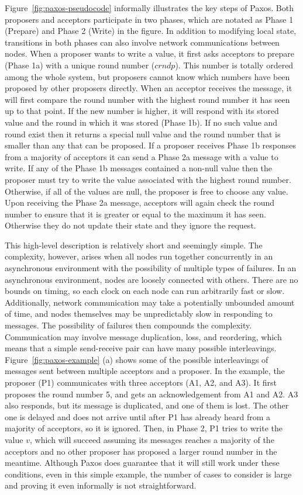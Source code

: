 Figure~\ref{fig:paxos-pseudocode} informally illustrates the key steps of Paxos.
Both proposers and acceptors participate in two phases, which are notated as Phase 1 (Prepare) and Phase 2 (Write) in the figure.
In addition to modifying local state, transitions in both phases can also involve network communications between nodes.
When a proposer wants to write a value, it first asks acceptors to prepare (Phase 1a) with a unique round number ($crndp$).
This number is totally ordered among the whole system, but proposers cannot know which numbers have been proposed by other proposers directly.
When an acceptor receives the message, it will first compare the round number with the highest round number it has seen up to that point.
If the new number is higher, it will respond with its stored value and the round in which it was stored (Phase 1b).
If no such value and round exist then it returns a special null value and the round number that is smaller than any that can be proposed.
If a proposer receives Phase 1b responses from a majority of acceptors it can send a Phase 2a message with a value to write.
If any of the Phase 1b messages contained a non-null value then the proposer must try to write the value associated with the highest round number.
Otherwise, if all of the values are null, the proposer is free to choose any value.
Upon receiving the Phase 2a message, acceptors will again check the round number to ensure that it is greater or equal to the maximum it has seen.
Otherwise they do not update their state and they ignore the request.


This high-level description is relatively short and seemingly simple.
The complexity, however, arises when all nodes run together concurrently in an asynchronous environment with the possibility of multiple types of failures.
In an asynchronous environment, nodes are loosely connected with others.
There are no bounds on timing, so each clock on each node can run arbitrarily fast or slow.
Additionally, network communication may take a potentially unbounded amount of time,
and nodes themselves may be unpredictably slow in responding to messages.
The possibility of failures then compounds the complexity.
Communication may involve message duplication, loss, and reordering, which means that a simple send-receive pair can have many possible interleavings.
Figure~\ref{fig:paxos-example} (a) shows some of the possible interleavings of messages sent between multiple acceptors and a proposer.
In the example, the proposer (P1) communicates with three acceptors (A1, A2, and A3).
It first proposes the round number 5, and gets an acknowledgement from A1 and A2.
A3 also responds, but its message is duplicated, and one of them is lost.
The other one is delayed and does not arrive until after P1 has already heard from a majority of acceptors, so it is ignored.
Then, in Phase 2, P1 tries to write the value $v$, which will succeed assuming its messages reaches a majority of the acceptors and no
other proposer has proposed a larger round number in the meantime.
Although Paxos does guarantee that it will still work under these conditions, even in this simple example,
the number of cases to consider is large and proving it even informally is not straightforward.

